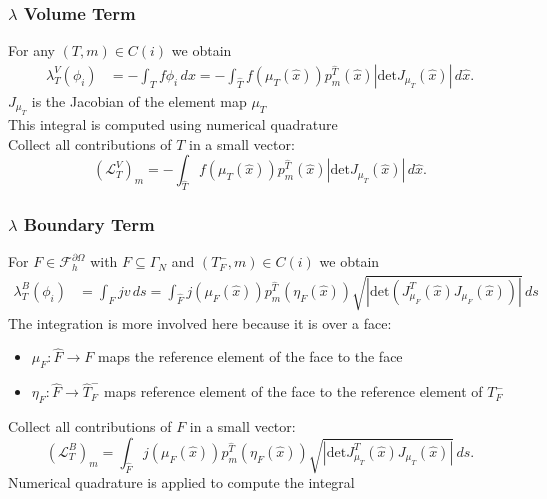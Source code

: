 \documentclass[aspectratio=169,11pt]{beamer}
\theoremstyle{definition}
\begin{document}
\begin{frame}
\frametitle{$\lambda$ Volume Term}
For any $(T,m)\in C(i)$ we obtain
\begin{equation*}
\begin{split}
\lambda_T^V(\phi_i) &= - \int_T f \phi_i \,dx =
- \int_{\hat T} f(\mu_T(\hat x)) p_m^{\hat T}(\hat x) |\text{det} J_{\mu_T}(\hat x)|\, d\hat x .
\end{split}
\end{equation*}
$J_{\mu_T}$ is the Jacobian of the element map $\mu_T$\\
\medskip
This integral is computed using numerical quadrature\\
\medskip
Collect all contributions of $T$ in a small vector:
\begin{equation*}
(\mathcal{L}_T^V)_m = - \int_{\hat T} f(\mu_T(\hat x)) p_m^{\hat T}(\hat x)
|\text{det} J_{\mu_T}(\hat x)|\, d\hat x.
\end{equation*}
\end{frame}

\begin{frame}
\frametitle{$\lambda$ Boundary Term}
For $F\in\mathcal{F}_h^{\partial\Omega}$ with $F\subseteq\Gamma_N$
and $(T_F^-,m)\in C(i)$ we obtain
\begin{equation*}
\begin{split}
\lambda_T^B(\phi_i) &= \int_{F} j v\,ds =
\int_{\hat F} j(\mu_F(\hat x)) p_m^{\hat T}(\eta_F(\hat x))
\sqrt{|\text{det} (J^T_{\mu_F}(\hat x)J_{\mu_F}(\hat x))|} \,ds
\end{split}
\end{equation*}
The integration is more involved here because it is over a face:
\begin{itemize}
\item $\mu_F: \hat F \to F$ maps the reference element of the face to the face
\item $\eta_F: \hat F \to \hat T_F^-$ maps reference
element of the face to the reference element of $T_F^-$
\end{itemize}
Collect all contributions of $F$ in a small vector:
\begin{equation*}
(\mathcal{L}_T^B)_m =
\int_{\hat F} j(\mu_F(\hat x)) p_m^{\hat T}(\eta_F(\hat x))
\sqrt{|\text{det} J^T_{\mu_T}(\hat x)J_{\mu_T}(\hat x)|} \,ds .
\end{equation*}
Numerical quadrature is applied to compute the integral
\end{frame}
\end{document}
